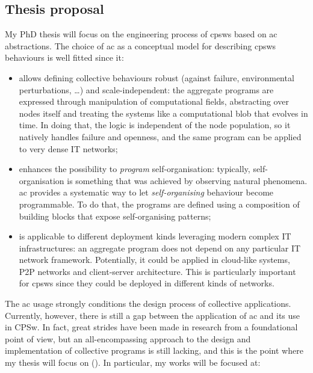 \documentclass[11pt]{article}
\begin{document}
\subsection{Thesis proposal}
My PhD thesis will focus on the engineering process of \acp{cpsw} based on \ac{ac} abstractions. 
%
The choice of \ac{ac} as a conceptual model for describing \acp{cpsw} behaviours is well fitted since it:
\begin{itemize}
	\item allows defining collective behaviours robust (against failure, environmental perturbations, \dots{}) and scale-independent: 
	the aggregate programs are expressed through manipulation of computational fields, abstracting over nodes itself and treating the systems like a computational blob that evolves in time. 
	In doing that, the logic is independent of the node population, so it natively handles failure and openness, and the same program can be applied to very dense IT networks;
	\item enhances the possibility to \textit{program} self-organisation: typically, self-organisation is something that was achieved by observing natural phenomena. 
	\ac{ac} provides a systematic way to let \textit{self-organising} behaviour become programmable.
	To do that, the programs are defined using a composition of building blocks that expose self-organising patterns;
	\item is applicable to different deployment kinds leveraging modern complex IT infrastructures: an aggregate program does not depend on any particular IT network framework. 
	Potentially, it could be applied in cloud-like systems, P2P networks and client-server architecture. 
	This is particularly important for \acp{cpsw} since they could be deployed in different kinds of networks.
\end{itemize}
The \ac{ac} usage strongly conditions the design process of collective applications.
%
Currently, however, there is still a gap between the application of \ac{ac} and its use in CPSw. 
%
In fact, great strides have been made in research from a foundational point of view, but an all-encompassing approach to the design and implementation of collective programs is still lacking, and this is the point where my thesis will focus on ().
%
In particular, my works will be focused at:
\end{document}
